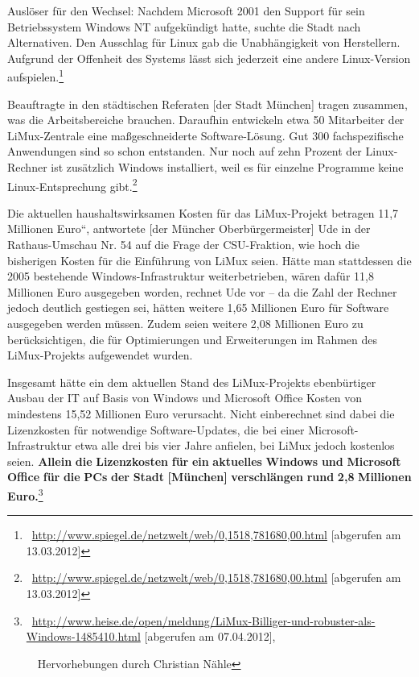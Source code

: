 \documentclass[a4paper]{article}
\begin{document}
{
{\guillemotright}Ausl\"oser f\"ur den Wechsel: Nachdem Microsoft 2001
den Support f\"ur sein Betriebssystem Windows NT aufgek\"undigt hatte,
suchte die Stadt nach Alternativen. Den Ausschlag f\"ur Linux gab die
Unabh\"angigkeit von Herstellern. Aufgrund der Offenheit des Systems
l\"asst sich jederzeit eine andere Linux-Version
aufspielen.{\guillemotleft}\footnote{\ \url{http://www.spiegel.de/netzwelt/web/0,1518,781680,00.html}
[abgerufen am 13.03.2012]}}

{
{\guillemotright}Beauftragte in den st\"adtischen Referaten [der Stadt
M\"unchen] tragen zusammen, was die Arbeitsbereiche brauchen. Daraufhin
entwickeln etwa 50 Mitarbeiter der LiMux-Zentrale eine
ma{\ss}geschneiderte Software-L\"osung. Gut 300 fachspezifische
Anwendungen sind so schon entstanden. Nur noch auf zehn Prozent der
Linux-Rechner ist zus\"atzlich Windows installiert, weil es f\"ur
einzelne Programme keine Linux-Entsprechung
gibt.{\guillemotleft}\footnote{\ \url{http://www.spiegel.de/netzwelt/web/0,1518,781680,00.html}
[abgerufen am 13.03.2012]}}

{
{\guillemotright}{\quotedblbase}Die aktuellen haushaltswirksamen Kosten
f\"ur das LiMux-Projekt betragen 11,7 Millionen
Euro{\textquotedblleft}, antwortete [der M\"uncher Oberb\"urgermeister]
Ude in der Rathaus-Umschau Nr. 54 auf die Frage der CSU-Fraktion, wie
hoch die bisherigen Kosten f\"ur die Einf\"uhrung von LiMux seien.
H\"atte man stattdessen die 2005 bestehende Windows-Infrastruktur
weiterbetrieben, w\"aren daf\"ur 11,8 Millionen Euro ausgegeben worden,
rechnet Ude vor -- da die Zahl der Rechner jedoch deutlich gestiegen
sei, h\"atten weitere 1,65 Millionen Euro f\"ur Software ausgegeben
werden m\"ussen. Zudem seien weitere 2,08 Millionen Euro zu
ber\"ucksichtigen, die f\"ur Optimierungen und Erweiterungen im Rahmen
des LiMux-Projekts aufgewendet wurden.}

{
Insgesamt h\"atte ein dem aktuellen Stand des LiMux-Projekts
ebenb\"urtiger Ausbau der IT auf Basis von Windows und Microsoft Office
Kosten von mindestens 15,52 Millionen Euro verursacht. Nicht
einberechnet sind dabei die Lizenzkosten f\"ur notwendige
Software-Updates, die bei einer Microsoft-Infrastruktur etwa alle drei
bis vier Jahre anfielen, bei LiMux jedoch kostenlos seien.
\textbf{Allein}\textbf{ }\textbf{die}\textbf{
}\textbf{Lizenzkosten}\textbf{ }\textbf{f\"ur}\textbf{
}\textbf{ein}\textbf{ }\textbf{aktuelles}\textbf{
}\textbf{Windows}\textbf{ }\textbf{und}\textbf{
}\textbf{Microsoft}\textbf{ }\textbf{Office}\textbf{
}\textbf{f\"ur}\textbf{ }\textbf{die}\textbf{ }\textbf{PCs}\textbf{
}\textbf{der}\textbf{ }\textbf{Stadt}\textbf{
}\textbf{[M\"unchen]}\textbf{ }\textbf{verschl\"angen}\textbf{
}\textbf{rund}\textbf{ }\textbf{2,8}\textbf{
}\textbf{Millionen}\textbf{
}\textbf{Euro.}{\guillemotleft}\footnote{\ \url{http://www.heise.de/open/meldung/LiMux-Billiger-und-robuster-als-Windows-1485410.html}
[abgerufen am 07.04.2012],\par \ \ Hervorhebungen durch Christian
N\"ahle}}
\end{document}
